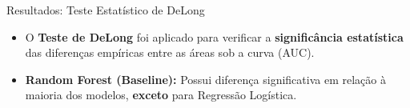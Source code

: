 \documentclass[aspectratio=169]{beamer}
\begin{document}
\begin{frame}{Resultados: Teste Estatístico de DeLong}
    \begin{itemize}
        \item O \textbf{Teste de DeLong} foi aplicado para verificar a \textbf{significância estatística} das diferenças empíricas entre as áreas sob a curva (AUC).
        \item \textbf{Random Forest (Baseline):} Possui diferença significativa em relação à maioria dos modelos, \textbf{exceto} para Regressão Logística.
    \end{itemize}
    \vspace{0.2cm}
    
    \begin{table}
        \centering
        \caption{Comparação com o modelo de melhor desempenho (Random Forest)}
        \vspace{0.1cm}
    \end{table}
\end{frame}
\end{document}
